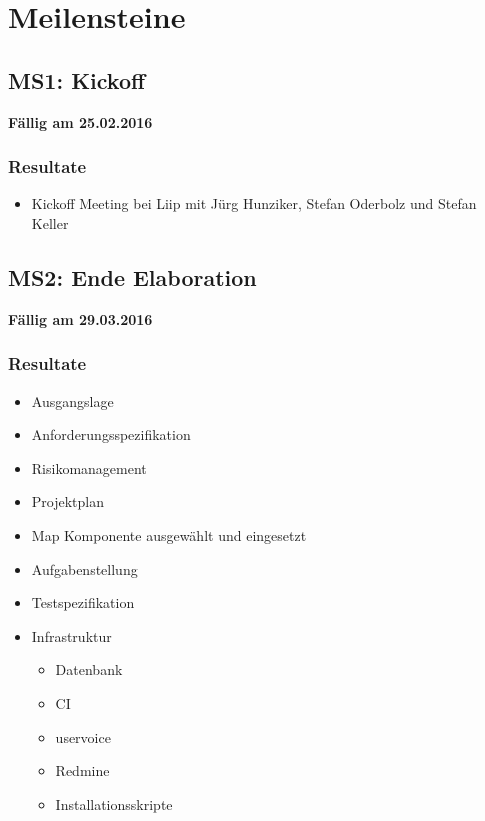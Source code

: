 \section{Meilensteine}
\subsection{MS1: Kickoff}
\label{pm-ms1}
\textbf{Fällig am 25.02.2016}
\subsubsection{Resultate}
\begin{itemize}
	\item Kickoff Meeting bei Liip mit Jürg Hunziker, Stefan Oderbolz und Stefan Keller
\end{itemize}

\subsection{MS2: Ende Elaboration}
\label{pm-ms2}
\textbf{Fällig am 29.03.2016}
\subsubsection{Resultate}
\begin{itemize}
	\item Ausgangslage
	\item Anforderungsspezifikation
	\item Risikomanagement
	\item Projektplan
	\item Map Komponente ausgewählt und eingesetzt
	\item Aufgabenstellung
	\item Testspezifikation
	\item Infrastruktur
	\begin{itemize}
		\item Datenbank
		\item CI
		\item uservoice
		\item Redmine
		\item Installationsskripte
	\end{itemize}
\end{itemize}

